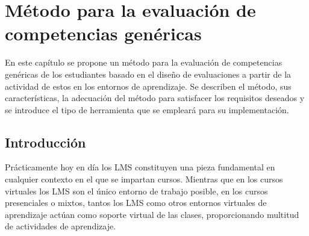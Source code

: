 



\chapter{Método para la evaluación de competencias genéricas}
\label{cha:Overall methodology}

\ifpdf
    \graphicspath{{4_overall_methodology/figures/PNG/}{4_overall_methodology/figures/PDF/}{4_overall_methodology/figures/}}
\else
    \graphicspath{{4_overall_methodology/figures/EPS/}{4_overall_methodology/figures/}}
\fi


En este capítulo se propone un método para la evaluación de competencias genéricas de los estudiantes basado en el diseño de evaluaciones a partir de la actividad de estos en los entornos de aprendizaje. Se describen el método, sus características, la adecuación del método para satisfacer los requisitos deseados y se introduce el tipo de herramienta que se empleará para su implementación.

\section{Introducción}

Prácticamente hoy en día los LMS constituyen una pieza fundamental en cualquier contexto en el que se impartan cursos. Mientras que en los cursos virtuales los LMS son el único entorno de trabajo posible, en los cursos presenciales o mixtos, tantos los LMS como otros entornos virtuales de aprendizaje actúan como soporte virtual de las clases, proporcionando multitud de actividades de aprendizaje. 

